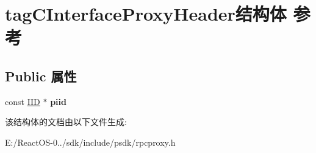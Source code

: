 \hypertarget{structtag_c_interface_proxy_header}{}\section{tag\+C\+Interface\+Proxy\+Header结构体 参考}
\label{structtag_c_interface_proxy_header}
\subsection*{Public 属性}
\begin{DoxyCompactItemize}
\item 
\mbox{\label{structtag_c_interface_proxy_header_a8ebff6f49b44d503965c8b0ab27746d5}} 
const \hyperlink{struct___i_i_d}{I\+ID} $\ast$ {\bfseries piid}
\end{DoxyCompactItemize}


该结构体的文档由以下文件生成\+:\begin{DoxyCompactItemize}
\item 
E\+:/\+React\+O\+S-\/0../sdk/include/psdk/rpcproxy.\+h\end{DoxyCompactItemize}

